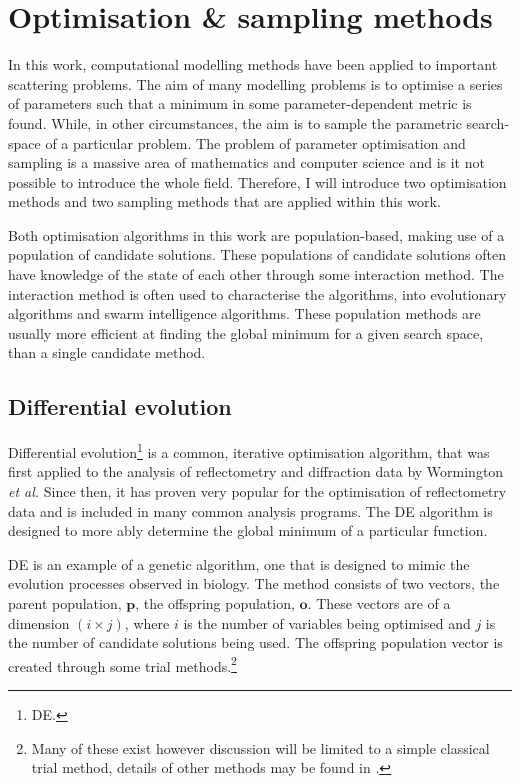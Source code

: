 \section{Optimisation \& sampling methods}
\label{sec:optimisation}
In this work, computational modelling methods have been applied to important scattering problems.
The aim of many modelling problems is to optimise a series of parameters such that a minimum in some parameter-dependent metric is found.
While, in other circumstances, the aim is to sample the parametric search-space of a particular problem.
The problem of parameter optimisation and sampling is a massive area of mathematics and computer science and is it not possible to introduce the whole field.
Therefore, I will introduce two optimisation methods and two sampling methods that are applied within this work.

Both optimisation algorithms in this work are population-based, making use of a population of candidate solutions.
These populations of candidate solutions often have knowledge of the state of each other through some interaction method.
The interaction method is often used to characterise the algorithms, into evolutionary algorithms and swarm intelligence algorithms.\autocite{wu_ensemble_2019}
These population methods are usually more efficient at finding the global minimum for a given search space, than a single candidate method.

\subsection{Differential evolution}
\label{sec:de}
Differential evolution\footnote{DE.} is a common, iterative optimisation algorithm, that was first applied to the analysis of reflectometry and diffraction data by Wormington \emph{et al.}\autocite{wormington_characterization_1999}
Since then, it has proven very popular for the optimisation of reflectometry data and is included in many common analysis programs.\autocite{bjorck_fitting_2011,bjorck_genx_2007,nelson_co-refinement_2006,nelson_refnx_2019,ott_simulreflec_nodate,kienzle_ncnr_nodate}
The DE algorithm is designed to more ably determine the global minimum of a particular function.\autocite{storn_differential_1997}

DE is an example of a genetic algorithm, one that is designed to mimic the evolution processes observed in biology.\autocite{holland_adaptation_1992}
The method consists of two vectors, the parent population, $\mathbf{p}$, the offspring population, $\mathbf{o}$.
These vectors are of a dimension $(i\times j)$, where $i$ is the number of variables being optimised and $j$ is the number of candidate solutions being used.
The offspring population vector is created through some trial methods.\footnote{Many of these exist however discussion will be limited to a simple classical trial method, details of other methods may be found in \cite{bjorck_fitting_20112}.}

